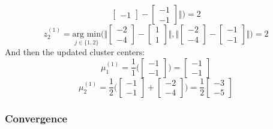 {$$\begin{bmatrix}
            -1
        \end{bmatrix} - \begin{bmatrix}
            -1 \\
            -1
        \end{bmatrix} \Biggr\Vert  \Biggr) = 2
    $$
        $$
        z_2^{(1)} = \underset{j\in\{1,2\}}{\text{arg min}} \Biggl( \Biggl\Vert \begin{bmatrix}
            -2 \\
            -4
        \end{bmatrix} - \begin{bmatrix}
            1 \\
            1
        \end{bmatrix} \Biggr\Vert, \Biggl\Vert \begin{bmatrix}
            -2 \\
            -4
        \end{bmatrix} - \begin{bmatrix}
            -1 \\
            -1
        \end{bmatrix} \Biggr\Vert  \Biggr) = 2
    $$
    And then the updated cluster centers:
    $$
        \mu_1^{(1)} = \frac{1}{1}\Biggl( \begin{bmatrix}
            -1 \\
            -1
        \end{bmatrix} \Biggr) = \begin{bmatrix}
            -1 \\
            -1
        \end{bmatrix}
    $$
    $$
        \mu_2^{(1)} = \frac{1}{2}\Biggl( \begin{bmatrix}
            -1 \\
            -1
        \end{bmatrix} + \begin{bmatrix}
            -2 \\
            -4
        \end{bmatrix} \Biggr) = \frac{1}{2}\begin{bmatrix}
            -3  \\
            -5
        \end{bmatrix}
    $$
}


\subsubsection{Convergence}

